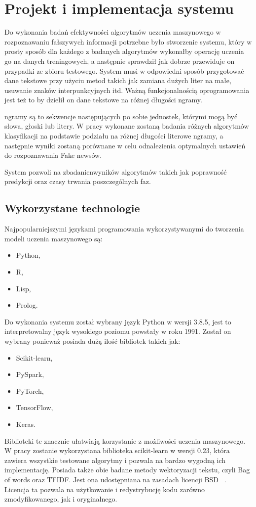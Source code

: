\chapter{Projekt i implementacja systemu}
Do wykonania badań efektywności algorytmów uczenia maszynowego w rozpoznawaniu
fałszywych informacji potrzebne było stworzenie systemu, który w prosty sposób 
dla każdego z badanych algorytmów wykonałby operację uczenia go na danych treningowych,
a następnie sprawdził jak dobrze przewiduje on przypadki ze zbioru testowego.
System musi w odpowiedni sposób przygotować dane tekstowe przy użyciu metod takich jak zamiana dużych liter na małe, usuwanie znaków interpunkcyjnych itd.
Ważną funkcjonalnością oprogramowania jest też to by dzielił on dane tekstowe na 
różnej długości ngramy. 

ngramy są to sekwencje następujących po sobie jednostek, którymi mogą być słowa, 
głoski lub litery. W pracy wykonane zostaną badania różnych algorytmów klasyfikacji
na podstawie podziału na różnej długości literowe ngramy, a następnie wyniki zostaną
porównane w celu odnalezienia optymalnych ustawień do rozpoznawania Fake newsów.

System pozwoli na zbadanienwyników algorytmów takich jak poprawność predykcji oraz 
czasy trwania poszczególnych faz.

\section{Wykorzystane technologie}
Najpopularniejszymi językami programowania wykorzystywanymi do tworzenia modeli uczenia
maszynowego są:
\begin{itemize}
    \item Python,
    \item R,
    \item Lisp,
    \item Prolog.
\end{itemize}
Do wykonania systemu został wybrany język Python w wersji 3.8.5, jest to interpretowalny
język wysokiego poziomu powstały w roku 1991. Został on wybrany 
ponieważ posiada dużą ilość bibliotek takich jak: 
\begin{itemize}
    \item Scikit-learn,
    \item PySpark,
    \item PyTorch,
    \item TensorFlow,
    \item Keras.
\end{itemize}
Biblioteki te znacznie ułatwiają korzystanie z możliwości uczenia maszynowego.
W pracy zostanie wykorzystana biblioteka scikit-learn w wersji 0.23, która zawiera wszystkie 
testowane algorytmy i pozwala na bardzo wygodną ich implementację. Posiada także obie 
badane metody wektoryzacji tekstu, czyli Bag of words oraz TFIDF. Jest ona udostępniana na zasadach licencji BSD ~\cite{scikitlearn}. 
Licencja ta pozwala na użytkowanie i redystrybucję kodu zarówno zmodyfikowanego, jak i oryginalnego.

